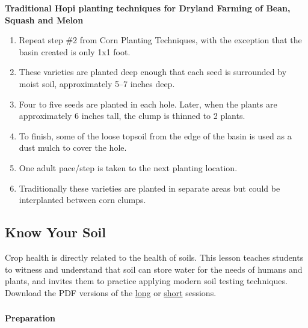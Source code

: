 \documentclass[12pt,]{article}
\providecommand{\tightlist}{%
  \setlength{\itemsep}{0pt}\setlength{\parskip}{0pt}}
\let\oldparagraph\paragraph
\renewcommand{\paragraph}[1]{\oldparagraph{#1}\mbox{}}
\begin{document}
\textbf{Traditional Hopi planting techniques for Dryland Farming of Bean, Squash and Melon}

\begin{enumerate}
\def\labelenumi{\arabic{enumi}.}
\tightlist
\item
  Repeat step \#2 from Corn Planting Techniques, with the exception that the basin created is only 1x1 foot.
\item
  These varieties are planted deep enough that each seed is surrounded by moist soil, approximately 5--7 inches deep.
\item
  Four to five seeds are planted in each hole. Later, when the plants are approximately 6 inches tall, the clump is thinned to 2 plants.
\item
  To finish, some of the loose topsoil from the edge of the basin is used as a dust mulch to cover the hole.
\item
  One adult pace/step is taken to the next planting location.
\item
  Traditionally these varieties are planted in separate areas but could be interplanted between corn clumps.
\end{enumerate}

\hypertarget{know-your-soil}{%
\subsection{Know Your Soil}\label{know-your-soil}}

Crop health is directly related to the health of soils. This lesson teaches students to witness and understand that soil can store water for the needs of humans and plants, and invites them to practice applying modern soil testing techniques. Download the PDF versions of the \href{./lessons/PFP_Lesson-3_Know-Your-Soil_Long.pdf}{long} or \href{./lessons/PFP_Lesson-3_Know-Your-Soil_Short.pdf}{short} sessions.

\hypertarget{section-2}{%
\subsubsection*{}\label{section-2}}

\hypertarget{preparation-2}{%
\paragraph{Preparation}\label{preparation-2}}
\end{document}
